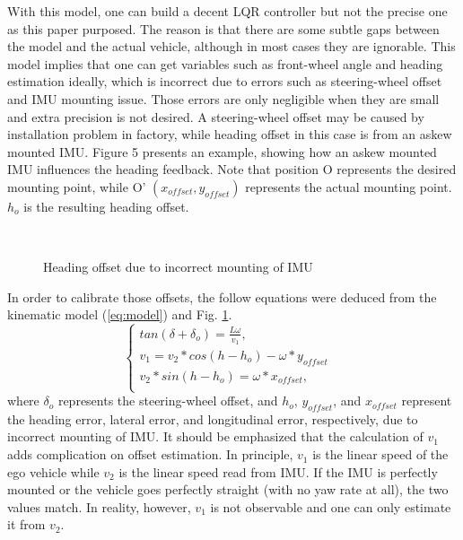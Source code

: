 \documentclass[letterpaper, 10 pt, conference]{ieeeconf}
\begin{document}
With this model, one can build a decent LQR controller but not the precise one as this paper purposed. The reason is that there are some subtle gaps between the model and the actual vehicle, although in most cases they are ignorable.
This model implies that one can get variables such as front-wheel angle and heading estimation ideally, which is incorrect due to errors such as steering-wheel offset and IMU mounting issue. Those errors are only negligible when they are small and extra precision is not desired. A steering-wheel offset may be caused by installation problem in factory, while heading offset in this case is from an askew mounted IMU. 
Figure 5 presents an example, showing how an askew mounted IMU influences the heading feedback. Note that position O represents the desired mounting point, while O' $(x_{offset}, y_{offset})$ represents the actual mounting point. $h_o$ is the resulting heading offset. 
\begin{figure}[thpb!]
\vspace{-0.cm}
\small
\centering
     \\    
  \caption{Heading offset due to incorrect mounting of IMU}
  \label{fig:heading_offset}
  \scriptsize{}
\end{figure}
In order to calibrate those offsets, the follow equations were deduced from the kinematic model (\ref{eq:model}) and Fig. \ref{fig:heading_offset}.
\begin{equation}
\left\{
             \begin{array}{lr}
             tan(\delta + \delta_{o}) = \frac{L\omega}{v_1}, & \\
             v_1 = v_2 * cos(h - h_o) - \omega * y_{offset} & \\
             v_2*sin(h-h_o) = \omega * x_{offset}, &  \\
             \end{array}
\right.
\label{eq:calibration}
\end{equation}
where $\delta_{o}$ represents the steering-wheel offset, and $h_o$, $y_{offset}$, and $x_{offset}$ represent the heading error, lateral error, and longitudinal error, respectively, due to incorrect mounting of IMU. 
It should be emphasized that the calculation of $v_1$ adds complication on offset estimation. In principle, $v_1$ is the linear speed of the ego vehicle while $v_2$ is the linear speed read from IMU. If the IMU is perfectly mounted or the vehicle goes perfectly straight (with no yaw rate at all), the two values match. In reality, however, $v_1$ is not observable and one can only estimate it from $v_2$. 
\end{document}
